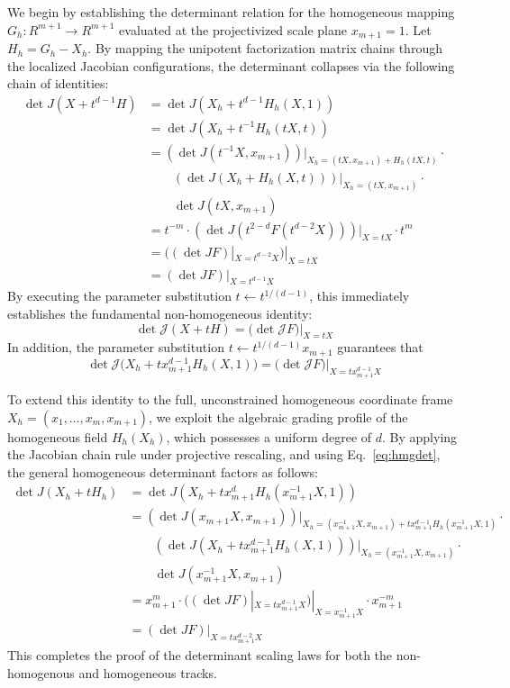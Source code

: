 \documentclass[11pt,a4paper]{article}
\begin{document}
We begin by establishing the determinant relation for the homogeneous mapping $G_h: R^{m+1} \to R^{m+1}$ evaluated at the projectivized scale plane $x_{m+1} = 1$. Let $H_h = G_h - X_h$. By mapping the unipotent factorization matrix chains through the localized Jacobian configurations, the determinant collapses via the following chain of identities:
\begin{align*}
\det J(X + t^{d-1} H) 
&= \det J(X_h + t^{d-1} H_h(X, 1)) \\
&= \det J(X_h + t^{-1} H_h(t X, t)) \\
&= (\det J(t^{-1} X, x_{m+1}))|_{X_h = (t X, x_{m+1}) + H_h(tX, t)} \cdot {} \\
&\qquad (\det J(X_h + H_h(X, t)))|_{X_h = (t X, x_{m+1})} \cdot {} \\
&\qquad \det J(t X, x_{m+1}) \\
&= t^{-m} \cdot (\det J(t^{2-d} F (t^{d-2}X)))|_{X = t X} \cdot t^{m} \\
&= ((\det J F)|_{X = t^{d-2} X})|_{X = t X} \\
&= (\det J F)|_{X = t^{d-1} X}
\end{align*}
By executing the parameter substitution $t \leftarrow t^{1/(d-1)}$, this immediately establishes the fundamental non-homogeneous identity:
$$
\det \mathcal{J}(X + t H) = \big(\det \mathcal{J} F\big)\big|_{X = t X}
$$
In addition, the parameter substitution $t \leftarrow  t^{1/(d-1)} x_{m+1}$ guarantees that
\begin{equation} \label{eq:hmgdet}
\det \mathcal{J}\big(X_h + t x_{m+1}^{d-1} H_h(X, 1)\big) = \big(\det \mathcal{J} F\big)\big|_{X = t x_{m+1}^{d-1} X}
\end{equation}

To extend this identity to the full, unconstrained homogeneous coordinate frame $X_h = (x_1, \dots, x_m, x_{m+1})$, we exploit the algebraic grading profile of the homogeneous field $H_h(X_h)$, which possesses a uniform degree of $d$. By applying the Jacobian chain rule under projective rescaling, and using Eq.~\ref{eq:hmgdet}, the general homogeneous determinant factors as follows:
\begin{align*}
\det J(X_h + t H_h)
&= \det J(X_h + t x_{m+1}^d H_h(x_{m+1}^{-1} X, 1)) \\
&= (\det J(x_{m+1} X, x_{m+1}))|_{X_h = (x_{m+1}^{-1}X,x_{m+1}) + t x_{m+1}^{d-1} H_h(x_{m+1}^{-1} X, 1)} \cdot {} \\
&\qquad (\det J(X_h + t x_{m+1}^{d-1} H_h(X, 1)))|_{X_h = (x_{m+1}^{-1} X, x_{m+1})} \cdot {} \\
&\qquad \det J(x_{m+1}^{-1} X, x_{m+1}) \\
&= x_{m+1}^m \cdot ((\det JF)|_{X = t x_{m+1}^{d-1} X})|_{X = x_{m+1}^{-1} X} \cdot x_{m+1}^{-m} \\
&= (\det JF)|_{X = t x_{m+1}^{d-2} X}
\end{align*}
This completes the proof of the determinant scaling laws for both the non-homogenous and homogeneous tracks.
\end{document}
